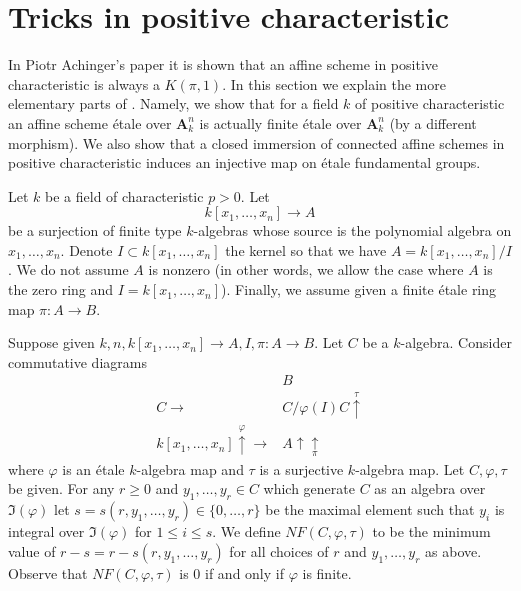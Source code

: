 \section{Tricks in positive characteristic}
\label{pione-section-achinger}
In Piotr Achinger's paper \cite{Achinger} it is shown that an
affine scheme in positive characteristic is always a $K(\pi, 1)$.
In this section we explain the more elementary parts of \cite{Achinger}.
Namely, we show that for a field $k$ of positive characteristic
an affine scheme \'etale over $\mathbf{A}^n_k$ is actually finite \'etale
over $\mathbf{A}^n_k$ (by a different morphism). We also show
that a closed immersion of connected affine schemes
in positive characteristic induces an injective map on
\'etale fundamental groups.

\medskip\noindent
Let $k$ be a field of characteristic $p > 0$.
Let
$$
k[x_1, \ldots, x_n] \longrightarrow A
$$
be a surjection of finite type $k$-algebras whose source is the
polynomial algebra on $x_1, \ldots, x_n$. Denote
$I \subset k[x_1, \ldots, x_n]$ the kernel so that we have
$A = k[x_1, \ldots, x_n]/I$. We do not assume $A$ is nonzero
(in other words, we allow the case where $A$ is the zero ring
and $I = k[x_1, \ldots, x_n]$). Finally, we assume given a
finite \'etale ring map $\pi : A \to B$.

\medskip\noindent
Suppose given $k, n, k[x_1, \ldots, x_n] \to A, I, \pi : A \to B$.
Let $C$ be a $k$-algebra. Consider
commutative diagrams
$$
\begin{array}{cc} & B \\ C \longrightarrow & C/\varphi(I)C \overset{\tau}{\uparrow} \\ k[x_1, \ldots, x_n] \overset{\varphi}{\uparrow}\longrightarrow & A \uparrow\underset{\pi}{\uparrow}\end{array}
$$
where $\varphi$ is an \'etale $k$-algebra map and $\tau$ is a
surjective $k$-algebra map.
Let $C, \varphi, \tau$ be given. For any $r \geq 0$ and
$y_1, \ldots, y_r \in C$ which generate $C$ as an algebra over
$\Im(\varphi)$ let $s = s(r, y_1, \ldots, y_r) \in \{0, \ldots, r\}$
be the maximal element such that $y_i$ is integral over $\Im(\varphi)$
for $1 \leq i \leq s$. We define $NF(C, \varphi, \tau)$
to be the minimum value of
$r - s = r - s(r, y_1, \ldots, y_r)$ for all choices of
$r$ and $y_1, \ldots, y_r$ as above.
Observe that $NF(C, \varphi, \tau)$ is $0$ if and only if $\varphi$ is finite.

